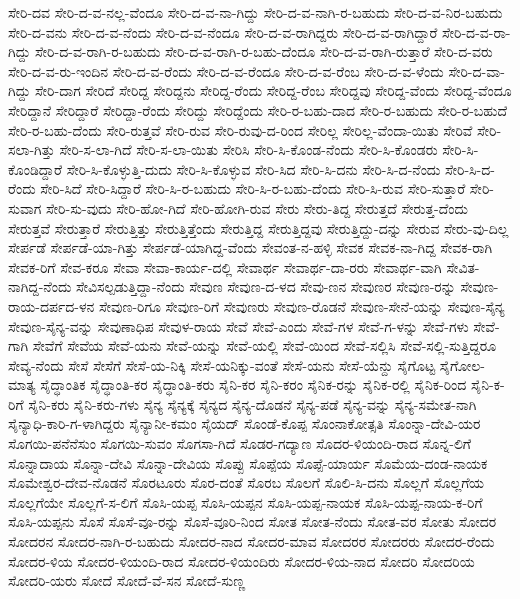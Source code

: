 ಸೇರಿ-ದವ
ಸೇರಿ-ದ-ವ-ನಲ್ಲ-ವೆಂದೂ
ಸೇರಿ-ದ-ವ-ನಾ-ಗಿದ್ದು
ಸೇರಿ-ದ-ವ-ನಾಗಿ-ರ-ಬಹುದು
ಸೇರಿ-ದ-ವ-ನಿರ-ಬಹುದು
ಸೇರಿ-ದ-ವನು
ಸೇರಿ-ದ-ವ-ನೆಂದು
ಸೇರಿ-ದ-ವ-ನೆಂದೂ
ಸೇರಿ-ದ-ವ-ರಾಗಿದ್ದರು
ಸೇರಿ-ದ-ವ-ರಾಗಿದ್ದಾರೆ
ಸೇರಿ-ದ-ವ-ರಾ-ಗಿದ್ದು
ಸೇರಿ-ದ-ವ-ರಾಗಿ-ರ-ಬಹುದು
ಸೇರಿ-ದ-ವ-ರಾಗಿ-ರ-ಬಹು-ದೆಂದೂ
ಸೇರಿ-ದ-ವ-ರಾಗಿ-ರುತ್ತಾರೆ
ಸೇರಿ-ದ-ವರು
ಸೇರಿ-ದ-ವ-ರು-ಇಂದಿನ
ಸೇರಿ-ದ-ವ-ರೆಂದು
ಸೇರಿ-ದ-ವ-ರೆಂದೂ
ಸೇರಿ-ದ-ವ-ರೆಂಬ
ಸೇರಿ-ದ-ವ-ಳೆಂದು
ಸೇರಿ-ದ-ವಾ-ಗಿದ್ದು
ಸೇರಿ-ದಾಗ
ಸೇರಿದೆ
ಸೇರಿದ್ದ
ಸೇರಿದ್ದನು
ಸೇರಿದ್ದ-ರೆಂದು
ಸೇರಿದ್ದ-ರೆಂಬ
ಸೇರಿದ್ದವು
ಸೇರಿದ್ದ-ವೆಂದು
ಸೇರಿದ್ದ-ವೆಂದೂ
ಸೇರಿದ್ದಾನೆ
ಸೇರಿದ್ದಾರೆ
ಸೇರಿದ್ದಾ-ರೆಂದು
ಸೇರಿದ್ದು
ಸೇರಿದ್ದೆಂದು
ಸೇರಿ-ರ-ಬಹು-ದಾದ
ಸೇರಿ-ರ-ಬಹುದು
ಸೇರಿ-ರ-ಬಹುದೆ
ಸೇರಿ-ರ-ಬಹು-ದೆಂದು
ಸೇರಿ-ರುತ್ತವೆ
ಸೇರಿ-ರುವ
ಸೇರಿ-ರುವು-ದ-ರಿಂದ
ಸೇರಿಲ್ಲ
ಸೇರಿಲ್ಲ-ವೆಂದಾ-ಯಿತು
ಸೇರಿವೆ
ಸೇರಿ-ಸಲಾ-ಗಿತ್ತು
ಸೇರಿ-ಸ-ಲಾ-ಗಿದೆ
ಸೇರಿ-ಸ-ಲಾ-ಯಿತು
ಸೇರಿಸಿ
ಸೇರಿ-ಸಿ-ಕೊಂಡ-ನೆಂದು
ಸೇರಿ-ಸಿ-ಕೊಂಡರು
ಸೇರಿ-ಸಿ-ಕೊಂಡಿದ್ದಾರೆ
ಸೇರಿ-ಸಿ-ಕೊಳ್ಳುತ್ತಿ-ದುದು
ಸೇರಿ-ಸಿ-ಕೊಳ್ಳುವ
ಸೇರಿ-ಸಿದ
ಸೇರಿ-ಸಿ-ದನು
ಸೇರಿ-ಸಿ-ದ-ನೆಂದು
ಸೇರಿ-ಸಿ-ದ-ರೆಂದು
ಸೇರಿ-ಸಿದೆ
ಸೇರಿ-ಸಿದ್ದಾರೆ
ಸೇರಿ-ಸಿ-ರ-ಬಹುದು
ಸೇರಿ-ಸಿ-ರ-ಬಹು-ದೆಂದು
ಸೇರಿ-ಸಿ-ರುವ
ಸೇರಿ-ಸುತ್ತಾರೆ
ಸೇರಿ-ಸುವಾಗ
ಸೇರಿ-ಸು-ವುದು
ಸೇರಿ-ಹೋ-ಗಿದೆ
ಸೇರಿ-ಹೋಗಿ-ರುವ
ಸೇರು
ಸೇರು-ತಿದ್ದ
ಸೇರುತ್ತದೆ
ಸೇರುತ್ತ-ದೆಂದು
ಸೇರುತ್ತವೆ
ಸೇರುತ್ತಾರೆ
ಸೇರುತ್ತಿತ್ತು
ಸೇರುತ್ತಿತ್ತೆಂದು
ಸೇರುತ್ತಿದ್ದ
ಸೇರುತ್ತಿದ್ದವು
ಸೇರುತ್ತಿದ್ದು-ದನ್ನು
ಸೇರುವ
ಸೇರು-ವು-ದಿಲ್ಲ
ಸೇರ್ಪಡೆ
ಸೇರ್ಪಡೆ-ಯಾ-ಗಿತ್ತು
ಸೇರ್ಪಡೆ-ಯಾಗಿದ್ದ-ವೆಂದು
ಸೇವಂತ-ನ-ಹಳ್ಳಿ
ಸೇವಕ
ಸೇವಕ-ನಾ-ಗಿದ್ದ
ಸೇವಕ-ರಾಗಿ
ಸೇವಕ-ರಿಗೆ
ಸೇವ-ಕರೂ
ಸೇವಾ
ಸೇವಾ-ಕಾರ್ಯ-ದಲ್ಲಿ
ಸೇವಾರ್ಥ
ಸೇವಾರ್ಥ-ದಾ-ರರು
ಸೇವಾರ್ಥ-ವಾಗಿ
ಸೇವಿತ-ನಾಗಿದ್ದ-ನೆಂದು
ಸೇವಿಸಲ್ಪಡುತ್ತಿದ್ದಾ-ನೆಂದು
ಸೇವುಣ
ಸೇವುಣ-ದ-ಳದ
ಸೇವು-ಣನ
ಸೇವುಣರ
ಸೇವುಣ-ರನ್ನು
ಸೇವುಣ-ರಾಯ-ದರ್ಪದ-ಳನ
ಸೇವುಣ-ರಿಗೂ
ಸೇವುಣ-ರಿಗೆ
ಸೇವುಣರು
ಸೇವುಣ-ರೊಡನೆ
ಸೇವುಣ-ಸೇನೆ-ಯನ್ನು
ಸೇವುಣ-ಸೈನ್ಯ
ಸೇವುಣ-ಸೈನ್ಯ-ವನ್ನು
ಸೇವುಣಾಧಿಪ
ಸೇವುಳ-ರಾಯ
ಸೇವೆ
ಸೇವೆ-ಎಂದು
ಸೇವೆ-ಗಳ
ಸೇವೆ-ಗ-ಳನ್ನು
ಸೇವೆ-ಗಳು
ಸೇವೆ-ಗಾಗಿ
ಸೇವೆಗೆ
ಸೇವೆಯ
ಸೇವೆ-ಯನು
ಸೇವೆ-ಯನ್ನು
ಸೇವೆ-ಯಲ್ಲಿ
ಸೇವೆ-ಯಿಂದ
ಸೇವೆ-ಸಲ್ಲಿಸಿ
ಸೇವೆ-ಸಲ್ಲಿ-ಸುತ್ತಿದ್ದರೂ
ಸೇವ್ಯ-ನೆಂದು
ಸೇಸೆ
ಸೇಸೆಗೆ
ಸೇಸೆ-ಯ-ನಿಕ್ಕಿ
ಸೇಸೆ-ಯನಿಕ್ಕು-ವಂತೆ
ಸೇಸೆ-ಯನು
ಸೇಸೆ-ಯೆನ್ದು
ಸೈಗೊಟ್ಟ
ಸೈಗೋಲ-ಮಾತ್ಯ
ಸೈದ್ಧಾಂತಿಕ
ಸೈದ್ಧಾಂತಿ-ಕರ
ಸೈದ್ಧಾಂತಿ-ಕರು
ಸೈನಿ-ಕರ
ಸೈನಿ-ಕರಂ
ಸೈನಿಕ-ರನ್ನು
ಸೈನಿಕ-ರಲ್ಲಿ
ಸೈನಿಕ-ರಿಂದ
ಸೈನಿ-ಕ-ರಿಗೆ
ಸೈನಿ-ಕರು
ಸೈನಿ-ಕರು-ಗಳು
ಸೈನ್ಯ
ಸೈನ್ಯಕ್ಕೆ
ಸೈನ್ಯದ
ಸೈನ್ಯ-ದೊಡನೆ
ಸೈನ್ಯ-ಪಡೆ
ಸೈನ್ಯ-ವನ್ನು
ಸೈನ್ಯ-ಸಮೇತ-ನಾಗಿ
ಸೈನ್ಯಾಧಿ-ಕಾರಿ-ಗ-ಳಾಗಿದ್ದರು
ಸೈನ್ಯಾನೀ-ಕಮಂ
ಸೈಯದ್
ಸೊಂಡೆ-ಕೊಪ್ಪ
ಸೊಂನಾಕೋತ್ಸತಿ
ಸೊಂನ್ನಾ-ದೇವಿ-ಯರ
ಸೊಗಯಿ-ಪನೆನೆಸುಂ
ಸೊಗಯಿ-ಸುವಂ
ಸೊಗಸಾ-ಗಿದೆ
ಸೊಡರ-ಗದ್ಯಾಣ
ಸೊದರ-ಳಿಯಂದಿ-ರಾದ
ಸೊನ್ನ-ಲಿಗೆ
ಸೊನ್ನಾದಾಯ
ಸೊನ್ನಾ-ದೇವಿ
ಸೊನ್ನಾ-ದೇವಿಯ
ಸೊಪ್ಪು
ಸೊಪ್ಪೆಯ
ಸೊಪ್ಪೆ-ಯಾರ್ಯ
ಸೊಮೆಯ-ದಂಡ-ನಾಯಕ
ಸೊಮೇಶ್ವರ-ದೇವ-ನೊಡನೆ
ಸೊರಟೂರು
ಸೊರ-ದಂತೆ
ಸೊರಬ
ಸೊಲಗೆ
ಸೊಲಿ-ಸಿ-ದನು
ಸೊಲ್ಲಗೆ
ಸೊಲ್ಲಗೆಯ
ಸೊಲ್ಲಗೆಯೇ
ಸೊಲ್ಲಗೆ-ಸ-ಲಿಗೆ
ಸೊಸಿ-ಯಪ್ಪ
ಸೊಸಿ-ಯಪ್ಪನ
ಸೊಸಿ-ಯಪ್ಪ-ನಾಯಕ
ಸೊಸಿ-ಯಪ್ಪ-ನಾಯ-ಕ-ರಿಗೆ
ಸೊಸಿ-ಯಪ್ಪನು
ಸೊಸೆ
ಸೊಸೆ-ವೂ-ರನ್ನು
ಸೊಸೆ-ವೂರಿ-ನಿಂದ
ಸೋತ
ಸೋತ-ನೆಂದು
ಸೋತ-ವರ
ಸೋತು
ಸೋದರ
ಸೋದರನ
ಸೋದರ-ನಾಗಿ-ರ-ಬಹುದು
ಸೋದರ-ನಾದ
ಸೋದರ-ಮಾವ
ಸೋದರರ
ಸೋದರರು
ಸೋದರ-ರೆಂದು
ಸೋದರ-ಳಿಯ
ಸೋದರ-ಳಿಯಂದಿ-ರಾದ
ಸೋದರ-ಳಿಯಂದಿರು
ಸೋದರ-ಳಿಯ-ನಾದ
ಸೋದರಿ
ಸೋದರಿಯ
ಸೋದರಿ-ಯರು
ಸೋದೆ
ಸೋದೆ-ವೆ-ಸನ
ಸೋದೆ-ಸುಣ್ಣ
